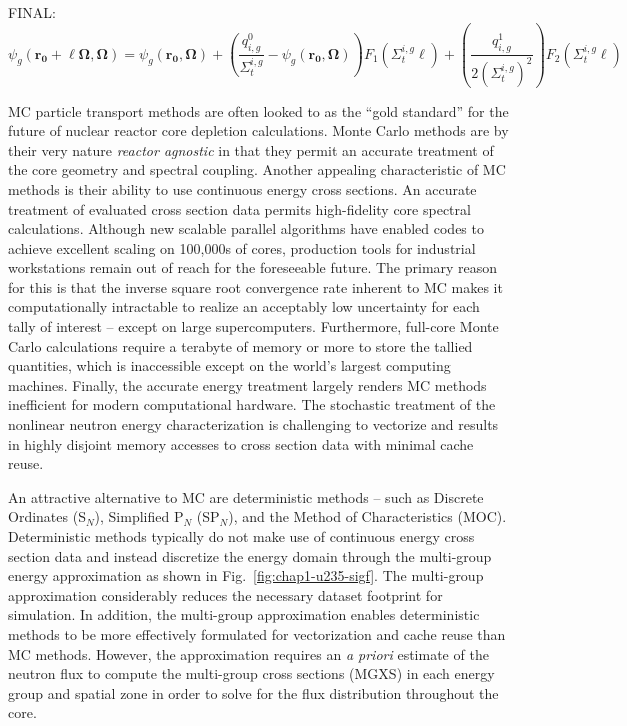 FINAL:
\begin{dmath}
	\psi_g(\mathbf{r_0} + \ell \mathbf{\Omega},\mathbf{\Omega}) = \psi_g(\mathbf{r_0},\mathbf{\Omega}) + \left( \frac{q^0_{i,g}}{\Sigma_{t}^{i,g}} - \psi_g(\mathbf{r_0},\mathbf{\Omega}) \right) F_1\left(\Sigma_{t}^{i,g} \ell\right) + \left(\frac{q^1_{i,g}}{2\left(\Sigma_{t}^{i,g}\right)^2}\right) F_2\left(\Sigma_{t}^{i,g} \ell\right)
\end{dmath}



\ac{MC} particle transport methods are often looked to as the ``gold standard'' for the future of nuclear reactor core depletion calculations. Monte Carlo methods are by their very nature \textit{reactor agnostic} in that they permit an accurate treatment of the core geometry and spectral coupling. Another appealing characteristic of \ac{MC} methods is their ability to use continuous energy cross sections. An accurate treatment of evaluated cross section data permits high-fidelity core spectral calculations. Although new scalable parallel algorithms have enabled codes to achieve excellent scaling on 100,000s of cores, production tools for industrial workstations remain out of reach for the foreseeable future. The primary reason for this is that the inverse square root convergence rate inherent to \ac{MC} makes it computationally intractable to realize an acceptably low uncertainty for each tally of interest -- except on large supercomputers. Furthermore, full-core Monte Carlo calculations require a terabyte of memory or more to store the tallied quantities, which is inaccessible except on the world's largest computing machines. Finally, the accurate energy treatment largely renders \ac{MC} methods inefficient for modern computational hardware. The stochastic treatment of the nonlinear neutron energy characterization is challenging to vectorize and results in highly disjoint memory accesses to cross section data with minimal cache reuse. 

An attractive alternative to MC are deterministic methods -- such as Discrete Ordinates (S$_N$), Simplified P$_N$ (SP$_N$), and the Method of Characteristics (MOC). Deterministic methods typically do not make use of continuous energy cross section data and instead discretize the energy domain through the multi-group energy approximation as shown in Fig.~\ref{fig:chap1-u235-sigf}. The multi-group approximation considerably reduces the necessary dataset footprint for simulation. In addition, the multi-group approximation enables deterministic methods to be more effectively formulated for vectorization and cache reuse than \ac{MC} methods. However, the approximation requires an \textit{a priori} estimate of the neutron flux to compute the multi-group cross sections (MGXS) in each energy group and spatial zone in order to solve for the flux distribution throughout the core.

